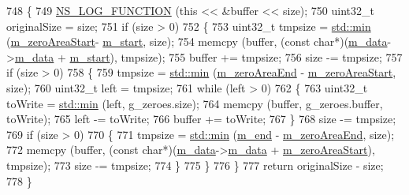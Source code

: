 \begin{DoxyCode}
748 \{
749   \hyperlink{log-macros-disabled_8h_a90b90d5bad1f39cb1b64923ea94c0761}{NS\_LOG\_FUNCTION} (\textcolor{keyword}{this} << &buffer << size);
750   uint32\_t originalSize = size;
751   \textcolor{keywordflow}{if} (size > 0)
752     \{
753       uint32\_t tmpsize = \hyperlink{80211b_8c_ac6afabdc09a49a433ee19d8a9486056d}{std::min} (\hyperlink{classns3_1_1Buffer_ae2ebe054c3e7e2ecdfd7fcb318bf085c}{m\_zeroAreaStart}-
      \hyperlink{classns3_1_1Buffer_afbea962435250b6a0a6c860c50b75386}{m\_start}, size);
754       memcpy (buffer, (\textcolor{keyword}{const} \textcolor{keywordtype}{char}*)(\hyperlink{classns3_1_1Buffer_aad1ff41b0403829d7aadfef80783484d}{m\_data}->\hyperlink{structns3_1_1Buffer_1_1Data_a29e7d0a3b4e7e8272d06eb8c8e51ed04}{m\_data} + \hyperlink{classns3_1_1Buffer_afbea962435250b6a0a6c860c50b75386}{m\_start}), tmpsize);
755       buffer += tmpsize;
756       size -= tmpsize;
757       \textcolor{keywordflow}{if} (size > 0) 
758         \{ 
759           tmpsize = \hyperlink{80211b_8c_ac6afabdc09a49a433ee19d8a9486056d}{std::min} (\hyperlink{classns3_1_1Buffer_a50eb9a6ce5a2a75c25718edb92b8fdc0}{m\_zeroAreaEnd} - 
      \hyperlink{classns3_1_1Buffer_ae2ebe054c3e7e2ecdfd7fcb318bf085c}{m\_zeroAreaStart}, size);
760           uint32\_t left = tmpsize;
761           \textcolor{keywordflow}{while} (left > 0)
762             \{
763               uint32\_t toWrite = \hyperlink{80211b_8c_ac6afabdc09a49a433ee19d8a9486056d}{std::min} (left, g\_zeroes.size);
764               memcpy (buffer, g\_zeroes.buffer, toWrite);
765               left -= toWrite;
766               buffer += toWrite;
767             \}
768           size -= tmpsize;
769           \textcolor{keywordflow}{if} (size > 0)
770             \{
771               tmpsize = \hyperlink{80211b_8c_ac6afabdc09a49a433ee19d8a9486056d}{std::min} (\hyperlink{classns3_1_1Buffer_a1f83bdf72c64ddd2a2e862b64236f29d}{m\_end} - \hyperlink{classns3_1_1Buffer_a50eb9a6ce5a2a75c25718edb92b8fdc0}{m\_zeroAreaEnd}, size);
772               memcpy (buffer, (\textcolor{keyword}{const} \textcolor{keywordtype}{char}*)(\hyperlink{classns3_1_1Buffer_aad1ff41b0403829d7aadfef80783484d}{m\_data}->\hyperlink{structns3_1_1Buffer_1_1Data_a29e7d0a3b4e7e8272d06eb8c8e51ed04}{m\_data} + 
      \hyperlink{classns3_1_1Buffer_ae2ebe054c3e7e2ecdfd7fcb318bf085c}{m\_zeroAreaStart}), tmpsize);
773               size -= tmpsize;
774             \}
775         \}
776     \}
777   \textcolor{keywordflow}{return} originalSize - size;
778 \}
\end{DoxyCode}
